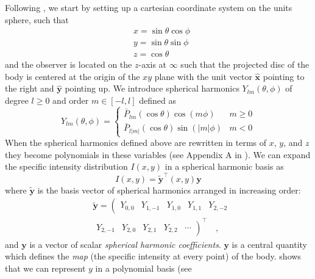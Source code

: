 \documentclass[12pt]{report}
\begin{document}
Following \citet{2019AJ....157...64L}, we start by setting up a cartesian
coordinate system on the units sphere, such that
\begin{align}
     & x=\sin \theta \cos \phi \\
     & y=\sin \theta \sin \phi \\
     & z=\cos \theta
\end{align}
and the observer is located on the $z$-axis at $\infty$ such that the projected disc
of the body is centered at the origin of the $xy$ plane with the unit vector
$\hat{\mathbf{x}}$ pointing to the right and $\hat{\mathbf{y}}$ pointing up.
We introduce spherical harmonics $Y_{l m}(\theta, \phi)$ of degree $l\geq 0$ and order
$m\in [-l, l]$ defined  as
\begin{equation}
    Y_{l m}(\theta, \phi)= \begin{cases}\bar{P}_{l m}(\cos \theta) \cos (m \phi) & m \geqslant 0 \\ \bar{P}_{l|m|}(\cos \theta) \sin (|m| \phi) & m<0\end{cases}
    \label{eq:spherical_harmonics}
\end{equation}
When the spherical harmonics defined above are rewritten in terms of $x$, $y$, and $z$
they become polynomials in these variables (see Appendix A in \citet{2019AJ....157...64L}).
We can expand the specific intensity distribution $I(x,y)$ in a spherical harmonic basis
as
\begin{equation}
    I(x, y)=\tilde{\mathbf{y}}^{\top}(x, y) \mathbf{y}
    \label{eq:sh_expansion}
\end{equation}
where $\tilde{\mathbf{y}}$ is the basis vector of spherical harmonics  arranged in
increasing order:
\begin{align}
     & \tilde{\mathbf{y}}=\left(\begin{array}{lllll}
                                    Y_{0,0} & Y_{1,-1} & Y_{1,0} & Y_{1,1} & Y_{2,-2}
                                \end{array}\right. \\
     & \left.\begin{array}{lllll}
                 Y_{2,-1} & Y_{2,0} & Y_{2,1} & Y_{2,2} & \cdots
             \end{array}\right)^{\top} \quad,
\end{align}
and $\mathbf{y}$ is a vector of scalar \emph{spherical harmonic coefficients}.
$\mathbf{y}$ is a central quantity which defines the \emph{map} (the specific
intensity at every point) of the body.
\citet{2019AJ....157...64L} shows that we can represent $y$ in a polynomial basis (see
\end{document}
